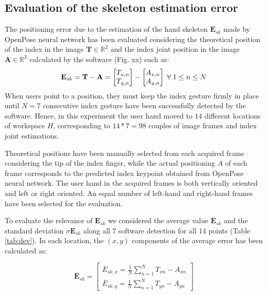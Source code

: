 \documentclass[a4paper, 10pt, conference]{ieeeconf}      %
\begin{document}
\subsection{Evaluation of the skeleton estimation error}
The positioning error due to the estimation of the hand skeleton $\mathbf{E}_{sk}$ made by OpenPose neural network has been evaluated considering the theoretical position of the index in the image $\mathbf{T} \in \mathbb{R}^2$ and the index joint position in the image $\mathbf{A} \in \mathbb{R}^2$ calculated by the software (Fig. xx) such as:
\begin{equation}
\mathbf{E}_{sk} = \mathbf{T} - \mathbf{A} = \begin{bmatrix}
T_{x,n}\\
T_{y,n}
\end{bmatrix}-
\begin{bmatrix}
A_{x,n}\\
A_{y,n}
\end{bmatrix}
\thickspace
\forall \thickspace 1 \leq n \leq N
\end{equation}
When users point to a position, they must keep the index gesture firmly in place until $N = 7$ consecutive index gesture have been successfully detected by the software. Hence, in this experiment the user hand moved to $14$ different locations of workspace $H$, corresponding to $14 * 7 = 98$ couples of image frames and index joint estimations.

Theoretical positions have been manually selected from each acquired frame considering the tip of the index finger, while the actual positioning $A$ of each frame corresponds to the predicted index keypoint obtained from OpenPose neural network. The user hand in the acquired frames is both vertically oriented and left or right oriented. An equal number of left-hand and right-hand frames have been selected for the evaluation.

To evaluate the relevance of $\mathbf{E}_{sk}$ we considered the average value $\overline{\mathbf{E}}_{sk}$ and the standard deviation $\sigma{\mathbf{E}}_{sk}$ along all 7 software detection for all 14 points (Table \ref{tab:dev}). In each location, the $(x,y)$ components of the average error has been calculated as:

\begin{equation}
\overline{\mathbf{E}}_{sk} = \begin{bmatrix}
\overline{E}_{sk,x}  = \frac{1}{N}\sum_{n=1}^{N} T_{xn} - A_{xn} \\
\overline{E}_{sk,y} = \frac{1}{N}\sum_{n=1}^{N} T_{yn} - A_{yn}
\end{bmatrix}
\end{equation}
\end{document}
